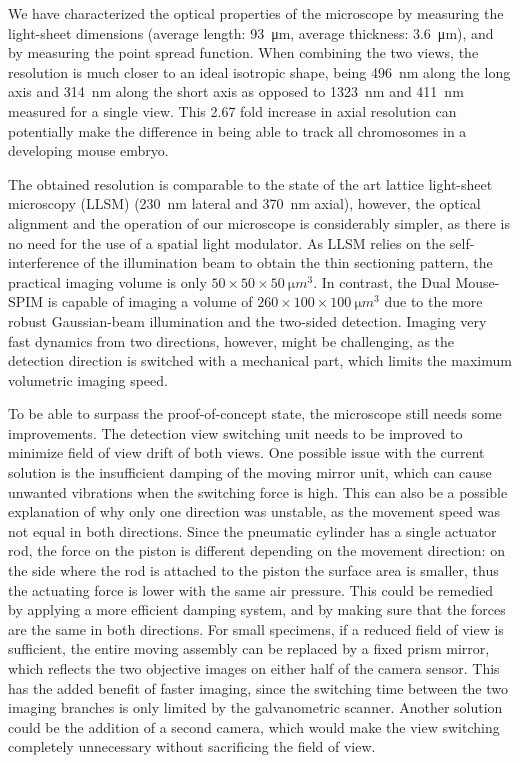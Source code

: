   We have characterized the optical properties of the microscope by measuring the light-sheet dimensions (average length: \SI{93}{\micro m}, average thickness: \SI{3.6}{\micro m}), and by measuring the point spread function. When combining the two views, the resolution is much closer to an ideal isotropic shape, being \SI{496}{nm} along the long axis and \SI{314}{nm} along the short axis as opposed to \SI{1323}{nm} and \SI{411}{nm} measured for a single view. This 2.67 fold increase in axial resolution can potentially make the difference in being able to track all chromosomes in a developing mouse embryo.

  The obtained resolution is comparable to the state of the art lattice light-sheet microscopy (LLSM) \cite{chen_lattice_2014} (\SI{230}{nm} lateral and \SI{370}{nm} axial), however, the optical alignment and the operation of our microscope is considerably simpler, as there is no need for the use of a spatial light modulator. As LLSM relies on the self-interference of the illumination beam to obtain the thin sectioning pattern, the practical imaging volume is only $50 \times 50 \times \SI{50}{\micro m ^3}$. In contrast, the Dual Mouse-SPIM is capable of imaging a volume of $260 \times 100 \times \SI{100}{\micro m ^3}$ due to the more robust Gaussian-beam illumination and the two-sided detection. Imaging very fast dynamics from two directions, however, might be challenging, as the detection direction is switched with a mechanical part, which limits the maximum volumetric imaging speed.

  To be able to surpass the proof-of-concept state, the microscope still needs some improvements. The detection view switching unit needs to be improved to minimize field of view drift of both views. One possible issue with the current solution is the insufficient damping of the moving mirror unit, which can cause unwanted vibrations when the switching force is high. This can also be a possible explanation of why only one direction was unstable, as the movement speed was not equal in both directions. Since the pneumatic cylinder has a single actuator rod, the force on the piston is different depending on the movement direction: on the side where the rod is attached to the piston the surface area is smaller, thus the actuating force is lower with the same air pressure. This could be remedied by applying a more efficient damping system, and by making sure that the forces are the same in both directions. For small specimens, if a reduced field of view is sufficient, the entire moving assembly can be replaced by a fixed prism mirror, which reflects the two objective images on either half of the camera sensor. This has the added benefit of faster imaging, since the switching time between the two imaging branches is only limited by the galvanometric scanner. Another solution could be the addition of a second camera, which would make the view switching completely unnecessary without sacrificing the field of view.
  
